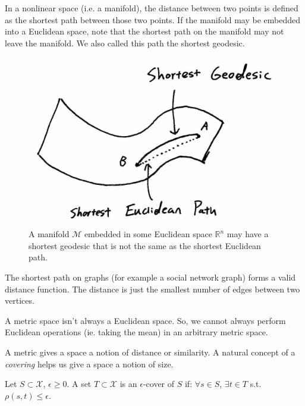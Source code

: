 \begin{example}[Geodesics] In a nonlinear space (i.e. a manifold),
the distance between two points is defined as the shortest path
between those two points. If the manifold may be embedded into a
Euclidean space, note that the shortest path on the manifold may
not leave the manifold. We also called this path the shortest 
geodesic.
\end{example}
\begin{figure}
    \centering
    \captionsetup{width=0.8\textwidth}
    \includegraphics[scale=0.15]{chapter_1/files/geodesic.jpg}
    \caption{A manifold $\mathcal{M}$ embedded in some Euclidean
    space $\mathbb{R}^n$ may have a shortest geodesic that is
    not the same as the shortest Euclidean path.}
    \label{fig:geodesic}
\end{figure}
\begin{example} The shortest path on graphs (for 
example a social network graph) forms a valid distance function. The
distance is just the smallest number of edges between two vertices.
\end{example}
\begin{remark}
A metric space isn't always a Euclidean space. So, we cannot always
perform Euclidean operations (ie. taking the mean) in an arbitrary
metric space.
\end{remark}

A metric gives a space a notion of distance or similarity. A natural
concept of a \emph{covering} helps us give a space a notion of size.

\begin{definition}[Cover]
Let $S \subset \mathcal{X}$, $\epsilon \geq 0$. A set $T \subset
\mathcal{X}$ is an $\epsilon$-cover of $S$ if:  $\forall s \in S$,
$\exists t \in T$ s.t. $\rho(s,t) \le \epsilon$.
\end{definition}

